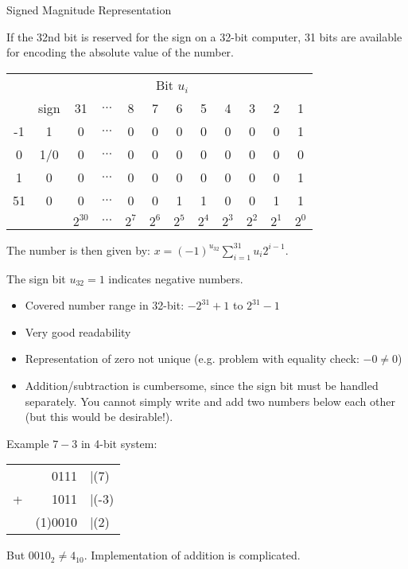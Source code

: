 \documentclass[11pt,compress,t,notes=noshow, xcolor=table]{beamer}
\begin{document}
\begin{vbframe}{Signed Magnitude Representation}



If the 32nd bit is reserved for the sign on a 32-bit computer, 31 bits are available for encoding the absolute value of the number.

\begin{footnotesize}
\begin{center}
  \begin{tabular}{ c | ccccccccccc}
    & \multicolumn{11}{c}{Bit $u_i$} \\
    & sign & 31  & $\hdots$ & 8 & 7 & 6 & 5 & 4 & 3 & 2 & 1 \\
    \hline
    -1 & 1 & 0 & $\hdots$ & 0 & 0 & 0 & 0 & 0 & 0 & 0 & 1 \\
     0 & 1/0 & 0 & $\hdots$ & 0 & 0 & 0 & 0 & 0 & 0 & 0 & 0 \\
     1 & 0 & 0 & $\hdots$ & 0 & 0 & 0 & 0 & 0 & 0 & 0 & 1 \\
    51 & 0 & 0 & $\hdots$ & 0 & 0 & 1 & 1 & 0 & 0 & 1 & 1 \\
    \hline
      &  & $2^{30}$ & $\hdots$ & $2^7$ & $2^6$ & $2^5$ & $2^4$ & $2^3$ & $2^2$ & $2^1$ & $2^0$
  \end{tabular}
\end{center}
\end{footnotesize}

The number is then given by: $x = (-1)^{u_{32}}\sum_{i=1}^{31} u_i 2^{i-1}$.

The sign bit $u_{32} = 1$ indicates negative numbers.



\framebreak
\begin{itemize}
  \item Covered number range in 32-bit: $-2^{31}+1$ to $2^{31}-1$
  \item Very good readability
  \item Representation of zero not unique (e.g. problem with equality check: $-0 \neq 0$)
  \item Addition/subtraction is cumbersome, since the sign bit must be handled separately. You cannot simply write and add two numbers below each other (but this would be desirable!).
\end{itemize}
Example $7 - 3$ in 4-bit system:

\begin{center}
  \begin{tabular}{crl}
    &0111 &|(7)\\
    +&1011 &|(-3)\\\hline
    &(1)0010 &|(2)
  \end{tabular}
\end{center}

But $0010_2 \neq 4_{10}$. Implementation of addition is complicated.
\end{vbframe}
\end{document}
